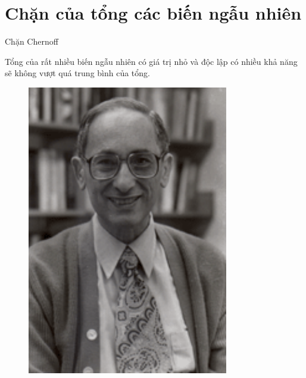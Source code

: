 \section{Chặn của tổng các biến ngẫu nhiên}
\begin{frame}{Chặn Chernoff}
  \begin{minipage}[c]{0.6\textwidth}
    Tổng của rất nhiều biến ngẫu nhiên có giá trị nhỏ và độc lập có nhiều khả năng sẽ  không vượt quá trung bình của tổng. 
  \end{minipage}\qquad 
  \begin{minipage}[c]{0.3\textwidth}
    \begin{figure}[h]
      \centering
      \includegraphics[width=\textwidth]{Chernoff.pdf}
    \end{figure}
    
  \end{minipage}
\end{frame}
